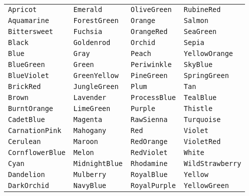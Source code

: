\documentclass{article}
\newcommand{\thiscolor}[1]{\texttt{#1} \hfill \fcolorbox{black}{#1}{\hspace{2mm}}}
\begin{document}
\begin{center}
\begin{tabular}{ llll } 
\thiscolor{Apricot} & \thiscolor{Emerald} & \thiscolor{OliveGreen} & \thiscolor{RubineRed} \\ 
\thiscolor{Aquamarine} & \thiscolor{ForestGreen} & \thiscolor{Orange} & \thiscolor{Salmon} \\ 
\thiscolor{Bittersweet} & \thiscolor{Fuchsia} & \thiscolor{OrangeRed} & \thiscolor{SeaGreen}\\ 
\thiscolor{Black} & \thiscolor{Goldenrod} & \thiscolor{Orchid} & \thiscolor{Sepia}\\ 
\thiscolor{Blue} & \thiscolor{Gray} & \thiscolor{Peach} & \thiscolor{YellowOrange}\\ 
\thiscolor{BlueGreen} & \thiscolor{Green} & \thiscolor{Periwinkle} & \thiscolor{SkyBlue}\\ 
\thiscolor{BlueViolet} & \thiscolor{GreenYellow} & \thiscolor{PineGreen} & \thiscolor{SpringGreen}\\ 
\thiscolor{BrickRed} & \thiscolor{JungleGreen} & \thiscolor{Plum} & \thiscolor{Tan}\\ 
\thiscolor{Brown} & \thiscolor{Lavender} & \thiscolor{ProcessBlue} & \thiscolor{TealBlue}\\ 
\thiscolor{BurntOrange} & \thiscolor{LimeGreen} & \thiscolor{Purple} & \thiscolor{Thistle}\\ 
\thiscolor{CadetBlue} & \thiscolor{Magenta} & \thiscolor{RawSienna} & \thiscolor{Turquoise}\\ 
\thiscolor{CarnationPink} & \thiscolor{Mahogany} & \thiscolor{Red} & \thiscolor{Violet}\\ 
\thiscolor{Cerulean} & \thiscolor{Maroon} & \thiscolor{RedOrange} & \thiscolor{VioletRed}\\ 
\thiscolor{CornflowerBlue} & \thiscolor{Melon} & \thiscolor{RedViolet} & \thiscolor{White}\\ 
\thiscolor{Cyan} & \thiscolor{MidnightBlue} & \thiscolor{Rhodamine} & \thiscolor{WildStrawberry}\\ 
\thiscolor{Dandelion} & \thiscolor{Mulberry} & \thiscolor{RoyalBlue} & \thiscolor{Yellow}\\ 
\thiscolor{DarkOrchid} & \thiscolor{NavyBlue} & \thiscolor{RoyalPurple} & \thiscolor{YellowGreen}
\end{tabular}
\end{center}
\end{document}
